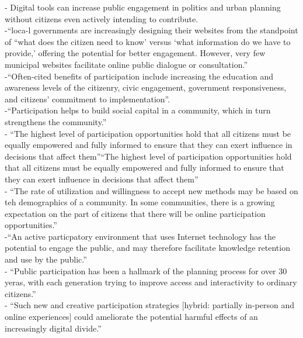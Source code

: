-{\color{orange} Digital tools can increase public engagement in politics and urban planning without citizens even actively intending to contribute.} \cite{Evans-Cowley2010}\\
-{\color{orange}“loca-l governments are increasingly designing their websites from the standpoint of “what does the citizen need to know’ versus ‘what information do we have to provide,’ offering the potential for better engagement. However, very few municipal websites facilitate online public dialogue or consultation.”}\cite{Evans-Cowley2010}\\
-{\color{orange}“Often-cited benefits of participation include increasing the education and awareness levels of the citizenry, civic engagement, government responsiveness, and citizens’ commitment to implementation”.} \cite{Evans-Cowley2010}\\
-{\color{orange}“Participation helps to build social capital in a community, which in turn strengthens the community.”} \cite{Evans-Cowley2010}\\
-{\color{orange} “The highest level of participation opportunities hold that all citizens must be equally empowered and fully informed to ensure that they can exert influence in decisions that affect them”“The highest level of participation opportunities hold that all citizens must be equally empowered and fully informed to ensure that they can exert influence in decisions that affect them”}\cite{Evans-Cowley2010}\\
-{\color{orange} “The rate of utilization and willingness to accept new methods may be based on teh demographics of a community. In some communities, there is a growing expectation on the part of citizens that there will be online participation opportunities.” }\cite{Evans-Cowley2010}\\
-{\color{orange}“An active particpatory environment that uses Internet technology has the potential to engage the public, and may therefore facilitate knowledge retention and use by the public.”} \cite{Evans-Cowley2010} \\
-{\color{orange} “Public participation has been a hallmark of the planning process for over 30 yeras, with each generation trying to improve access and interactivity to ordinary citizens.”} \cite{Evans-Cowley2010}\\
-{\color{orange} “Such new and creative participation strategies [hybrid: partially in-person and online experiences] could ameliorate the potential harmful effects of an increasingly digital divide.”}\cite{Evans-Cowley2010}\\
